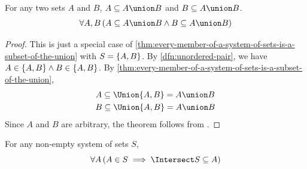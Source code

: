 \begin{thm}
    \label{thm:a-set-is-a-subset-of-its-union-with-another-set}
    For any two sets \( A \) and \( B \), \( A \subseteq A \union B \)
    and \( B \subseteq A \union B \).
    \begin{equation*}
        \forall A,B \, \mleft( A \subseteq A \union B \land B \subseteq A \union B \mright)
    \end{equation*}
\end{thm}

\begin{proof}
    This is just a special case of \cref{thm:every-member-of-a-system-of-sets-is-a-subset-of-the-union}
    with \( S = \mleft\{ A,B \mright\} \). By \cref{dfn:unordered-pair}, we have \( A \in \mleft\{ A,B \mright\}
    \land B \in \mleft\{ A,B \mright\} \).
    By \cref{thm:every-member-of-a-system-of-sets-is-a-subset-of-the-union},
    \begin{gather*}
        A \subseteq \Union \mleft\{ A,B \mright\} = A \union B \\
        B \subseteq \Union \mleft\{ A,B \mright\} = A \union B
    \end{gather*}
    Since \( A \) and \( B \) are arbitrary, the theorem follows from .
\end{proof}

\begin{thm}
    \label{thm:the-intersection-of-any-system-of-sets-is-a-subset-of-each-member-of-the-system}
    For any non-empty system of sets \( S \),
    \begin{equation*}
        \forall A \, \mleft( A \in S \implies \Intersect S \subseteq A \mright)
    \end{equation*}
\end{thm}

